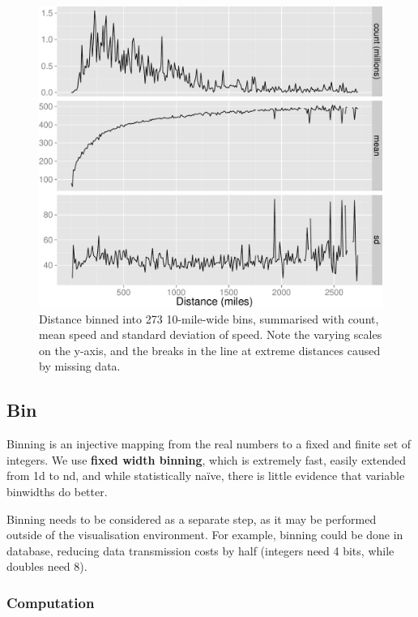\documentclass[journal]{vgtc}                %
\begin{document}
\begin{figure}[htb]
 \centering
 \includegraphics[width=\linewidth]{condense}
 \caption{Distance binned into 273 10-mile-wide bins, summarised with count, mean speed and standard deviation of speed. Note the varying scales on the y-axis, and the breaks in the line at extreme distances caused by missing data.}
 \label{fig:condense}
\end{figure}

\subsection{Bin}
\label{sub:bin}

Binning is an injective mapping from the real numbers to a fixed and finite set of integers. We use {\bf fixed width binning}, which is extremely fast, easily extended from 1d to nd, and while statistically na\"ive, there is little evidence that variable binwidths do better. 

Binning needs to be considered as a separate step, as it may be performed outside of the visualisation environment. For example, binning could be done in database, reducing data transmission costs by half (integers need 4 bits, while doubles need 8). 

\subsubsection{Computation}
\end{document}

